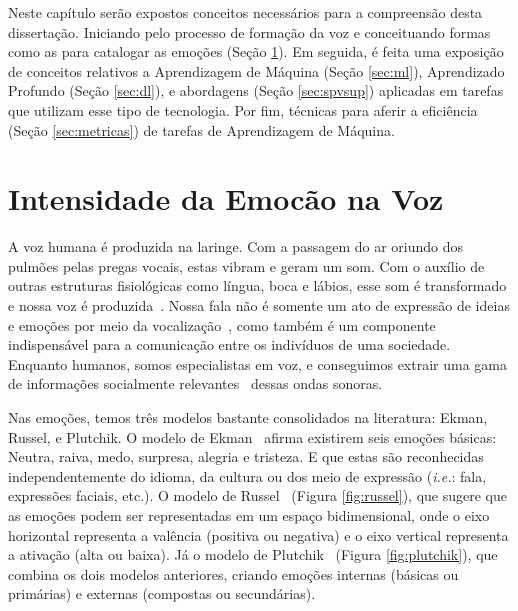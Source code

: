 
Neste capítulo serão expostos conceitos necessários para a compreensão desta dissertação. Iniciando pelo processo de formação da voz e conceituando formas como as para catalogar as emoções (Seção \ref{sec:vozemoint}). Em seguida, é feita uma exposição de conceitos relativos a Aprendizagem de Máquina (Seção \ref{sec:ml}), Aprendizado Profundo (Seção \ref{sec:dl}), e abordagens (Seção \ref{sec:spvsup}) aplicadas em tarefas que utilizam esse tipo de tecnologia. Por fim, técnicas para aferir a eficiência (Seção \ref{sec:metricas}) de tarefas de Aprendizagem de Máquina.\\

\section{Intensidade da Emocão na Voz}\label{sec:vozemoint}

A voz humana é produzida na laringe. Com a passagem do ar oriundo dos pulmões pelas pregas vocais, estas vibram e geram um som. Com o auxílio de outras estruturas fisiológicas como língua, boca e lábios, esse som é transformado e nossa voz é produzida~\cite{51}. Nossa fala não é somente um ato de expressão de ideias e emoções por meio da vocalização~\cite{6.31}, como também é um componente indispensável para a comunicação entre os indivíduos de uma sociedade. Enquanto humanos, somos especialistas em voz, e conseguimos extrair uma gama de informações socialmente relevantes~\cite{49} dessas ondas sonoras.

Nas emoções, temos três modelos bastante consolidados na literatura: Ekman, Russel, e Plutchik. O modelo de Ekman~\cite{31.9} afirma existirem seis emoções básicas: Neutra, raiva, medo, surpresa, alegria e tristeza. E que estas são reconhecidas independentemente do idioma, da cultura ou dos meio de expressão (\textit{i.e.}: fala, expressões faciais, etc.). O modelo de Russel~\cite{31.10} (Figura \ref{fig:russel}), que sugere que as emoções podem ser representadas em um espaço bidimensional, onde o eixo horizontal representa a valência (positiva ou negativa) e o eixo vertical representa a ativação (alta ou baixa). Já o modelo de Plutchik~\cite{57} (Figura \ref{fig:plutchik}), que combina os dois modelos anteriores, criando emoções internas (básicas ou primárias) e externas (compostas ou secundárias).

